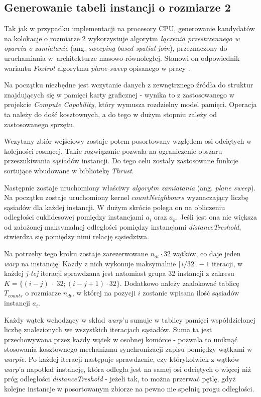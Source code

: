 \documentclass[12pt]{article}
\begin{document}
\subsection{Generowanie tabeli instancji o rozmiarze 2}

Tak jak w przypadku implementacji na procesory CPU, generowanie kandydatów na kolokacje o rozmiarze 2 wykorzystuje algorytm \textit{łączenia przestrzennego w oparciu o zamiatanie} (ang. \textit{sweeping-based spatial join}), przeznaczony do uruchamiania w~architekturze masowo-równoległej. Stanowi on odpowiednik wariantu \textit{Foxtrot} algorytmu \textit{plane-sweep} opisanego w pracy \cite{plane2}. 

Na początku niezbędne jest wczytanie danych z zewnętrznego źródła do struktur znajdujących się w pamięci karty graficznej - wynika to z zastosowanego w projekcie \textit{Compute Capability}, który wymusza rozdzielny model pamięci. Operacja ta należy do dość kosztownych, a do tego w dużym stopniu zależy od zastosowanego sprzętu.

Wczytany zbiór wejściowy zostaje potem posortowany względem osi odciętych w kolejności rosnącej. Takie rozwiązanie pozwala na ograniczenie obszaru przeszukiwania sąsiadów instancji. Do tego celu zostały zastosowane funkcje sortujące wbudowane w bibliotekę \textit{Thrust}.

Następnie zostaje uruchomiony właściwy \textit{algorytm zamiatania} (ang. \textit{plane sweep}). Na początku zostaje uruchomiony kernel $ countNeighbours $ wyznaczający liczbę sąsiadów dla każdej instancji. W dużym skrócie polega on na obliczeniu odległości euklidesowej pomiędzy instancjami $ a_{i} $ oraz $ a_{k} $. Jeśli jest ona nie większa od założonej maksymalnej odległości pomiędzy instancjami \textit{distanceTreshold}, stwierdza się pomiędzy nimi relację sąsiedztwa. 

Na potrzeby tego kroku zostaje zarezerwowane $ n_{dt} \cdot 32 $ wątków, co daje jeden \textit{warp} na instancję. Każdy z nich wykonuje maksymalnie $\lceil i / 32\rceil - 1$ iteracji, w każdej \textit{j-tej} iteracji sprawdzana jest natomiast grupa 32 instancji z zakresu $ K=\{(i - j)~\cdot~32; (i - j + 1) \cdot 32\} $. Dodatkowo należy zaalokować tablicę $ T_{counts} $ o rozmiarze $ n_{dt} $, w której na pozycji $ i $ zostanie wpisana ilość sąsiadów instancji $ a_{i} $.

Każdy wątek wchodzący w skład \textit{warp}'u sumuje w tablicy pamięci współdzielonej liczbę znalezionych we wszystkich iteracjach sąsiadów. Suma ta jest przechowywana przez każdy wątek w osobnej komórce - pozwala to uniknąć stosowania kosztownego mechanizmu synchronizacji zapisu pomiędzy wątkami w \textit{warpie}. Po każdej iteracji następuje sprawdzenie, czy którykolwiek z wątków \textit{warp}'a napotkał instancję, która odległa jest na samej osi odciętych o więcej niż próg odległości \textit{distanceTreshold} - jeżeli tak, to można przerwać pętlę, gdyż kolejne instancje w posortowanym zbiorze na pewno nie spełnią progu odległości.
\end{document}
